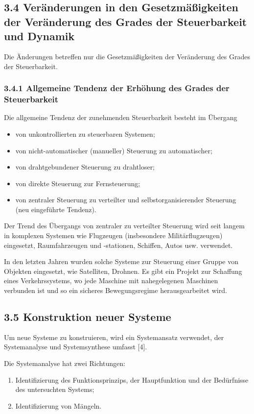 \documentclass[11pt,a4paper]{article}
\begin{document}
\subsection{3.4 Veränderungen in den Gesetzmäßigkeiten der Veränderung des
  Grades der Steuerbarkeit und Dynamik}

Die Änderungen betreffen nur die Gesetzmäßigkeiten der Veränderung des Grades
der Steuerbarkeit.

\subsubsection{3.4.1 Allgemeine Tendenz der Erhöhung des Grades der
  Steuerbarkeit} 

Die allgemeine Tendenz der zunehmenden Steuerbarkeit besteht im Übergang
\begin{itemize}[noitemsep]
\item von unkontrollierten zu steuerbaren Systemen;
\item von nicht-automatischer (manueller) Steuerung zu automatischer;
\item von drahtgebundener Steuerung zu drahtloser;
\item von direkte Steuerung zur Fernsteuerung;
\item von zentraler Steuerung zu verteilter und selbstorganisierender
  Steuerung (neu eingeführte Tendenz).
\end{itemize}

Der Trend des Übergangs von zentraler zu verteilter Steuerung wird seit langem
in komplexen Systemen wie Flugzeugen (insbesondere Militärflugzeugen)
eingesetzt, Raumfahrzeugen und \mbox{-st}ationen, Schiffen, Autos
usw. verwendet.

In den letzten Jahren wurden solche Systeme zur Steuerung einer Gruppe von
Objekten eingesetzt, wie Satelliten, Drohnen. Es gibt ein Projekt zur
Schaffung eines Verkehrssystems, wo jede Maschine mit nahegelegenen Maschinen
verbunden ist und so ein sicheres Bewegungsregime herausgearbeitet wird.

\subsection{3.5 Konstruktion neuer Systeme}

Um neue Systeme zu konstruieren, wird ein Systemansatz verwendet, der
Systemanalyse und Systemsynthese umfasst [4].

Die Systemanalyse hat zwei Richtungen:
\begin{enumerate}[noitemsep]
\item Identifizierung des Funktionsprinzips, der Hauptfunktion und der
  Bedürfnisse des untersuchten Systems;
\item Identifizierung von Mängeln.
\end{enumerate}
\end{document}
